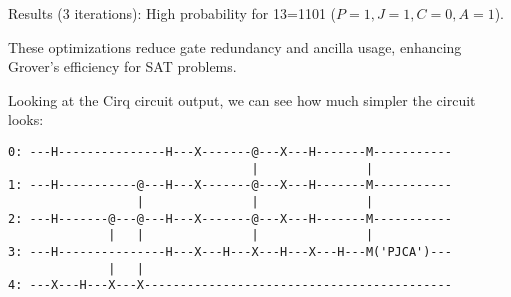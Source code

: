 Results (3 iterations): High probability for 13=1101 ($P=1, J=1, C=0, A=1$).

\vspace{0.3cm}

These optimizations reduce gate redundancy and ancilla usage, enhancing
Grover’s efficiency for SAT problems.

\vspace{0.3cm}

Looking at the Cirq circuit output, we can see how much simpler the circuit
looks:

\begin{verbatim}
0: ---H---------------H---X-------@---X---H-------M-----------
                                  |               |
1: ---H-----------@---H---X-------@---X---H-------M-----------
                  |               |               |
2: ---H-------@---@---H---X-------@---X---H-------M-----------
              |   |               |               |
3: ---H---------------H---X---H---X---H---X---H---M('PJCA')---
              |   |
4: ---X---H---X---X-------------------------------------------
\end{verbatim}


